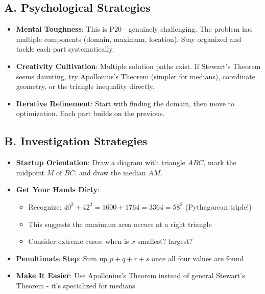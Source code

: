 \documentclass[12pt]{article}
\begin{document}
\begin{strategicbox}
\subsection*{A. Psychological Strategies}
\begin{itemize}[leftmargin=*]
    \item \textbf{Mental Toughness}: This is P20 - genuinely challenging. The problem has multiple components (domain, maximum, location). Stay organized and tackle each part systematically.
    
    \item \textbf{Creativity Cultivation}: Multiple solution paths exist. If Stewart's Theorem seems daunting, try Apollonius's Theorem (simpler for medians), coordinate geometry, or the triangle inequality directly.
    
    \item \textbf{Iterative Refinement}: Start with finding the domain, then move to optimization. Each part builds on the previous.
\end{itemize}

\subsection*{B. Investigation Strategies}
\begin{itemize}[leftmargin=*]
    \item \textbf{Startup Orientation}: Draw a diagram with triangle $ABC$, mark the midpoint $M$ of $BC$, and draw the median $AM$.
    
    \item \textbf{Get Your Hands Dirty}: 
    \begin{itemize}
        \item Recognize: $40^2 + 42^2 = 1600 + 1764 = 3364 = 58^2$ (Pythagorean triple!)
        \item This suggests the maximum area occurs at a right triangle
        \item Consider extreme cases: when is $x$ smallest? largest?
    \end{itemize}
    
    \item \textbf{Penultimate Step}: Sum up $p + q + r + s$ once all four values are found
    
    \item \textbf{Make It Easier}: Use Apollonius's Theorem instead of general Stewart's Theorem - it's specialized for medians
    

\end{itemize}
\end{strategicbox}
\end{document}

